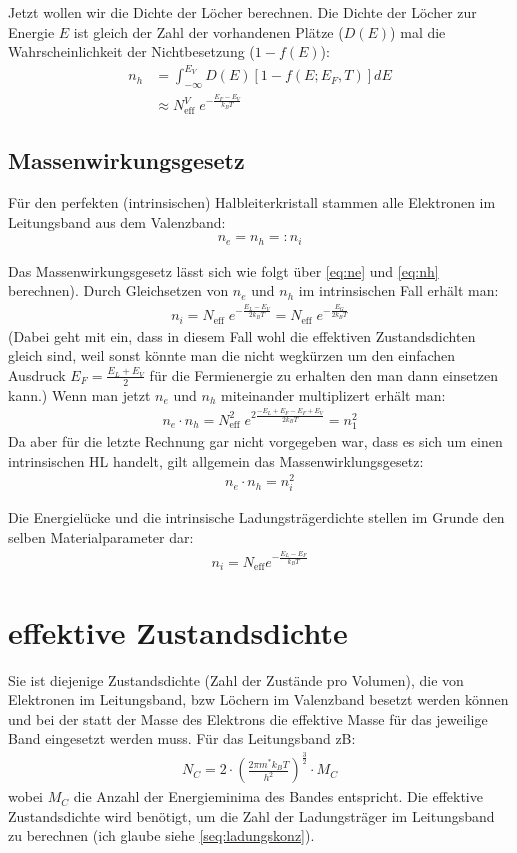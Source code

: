 \documentclass[paper=a4,10pt]{scrartcl}
\begin{document}
Jetzt wollen wir die Dichte der Löcher berechnen. Die Dichte der Löcher zur Energie $E$ ist gleich der Zahl der vorhandenen Plätze ($D(E)$) mal die Wahrscheinlichkeit der Nichtbesetzung ($1-f(E)$):
\begin{align}
\label{eq:nh}
n_h &= \int_{-\infty}^{E_V} D(E) [1-f(E; E_F, T)] dE \\
&\approx N^V_{\text{eff}} \;  e^{-\frac{E_F-E_V}{k_B T}}
\end{align}
\subsection{Massenwirkungsgesetz}
Für den perfekten (intrinsischen) Halbleiterkristall stammen alle Elektronen im Leitungsband aus dem Valenzband:
\begin{align}
n_e = n_h =: n_i
\end{align}

Das Massenwirkungsgesetz lässt sich wie folgt über \ref{eq:ne} und \ref{eq:nh} berechnen). Durch Gleichsetzen von $n_e$ und $n_h$ im intrinsischen Fall erhält man:
\begin{align}
n_i = N_{\text{eff}} \; e^{-\frac{E_L-E_V}{2k_BT}} = N_{\text{eff}} \; e^{-\frac{E_G}{2k_BT}}
\label{eq:intri_gleich}
\end{align}
(Dabei geht mit ein, dass in diesem Fall wohl die effektiven Zustandsdichten gleich sind, weil sonst könnte man die nicht wegkürzen um den einfachen Ausdruck $E_F = \frac{E_L + E_V}{2}$ für die Fermienergie zu erhalten den man dann einsetzen kann.)
Wenn man jetzt $n_e$ und $n_h$ miteinander multiplizert erhält man:
\begin{align}
n_e \cdot n_h = N^2_{\text{eff}} \; e^{2\frac{-E_L + E_F - E_F + E_V}{2k_BT}} = n_1^2
\end{align}
Da aber für die letzte Rechnung gar nicht vorgegeben war, dass es sich um einen intrinsischen HL handelt, gilt allgemein das Massenwirklungsgesetz:
\begin{align}
n_e \cdot n_h = n_i^2
\end{align}

Die Energielücke und die intrinsische Ladungsträgerdichte stellen im Grunde den selben Materialparameter dar:
\begin{align}
n_i = N_{\text{eff}} e^{- \frac{E_L-E_F}{k_BT}}
\end{align}
\section{effektive Zustandsdichte}
\label{sec:effZD}
Sie ist diejenige Zustandsdichte (Zahl der Zustände pro Volumen), die von Elektronen im Leitungsband, bzw Löchern im Valenzband besetzt werden können und bei der statt der Masse des Elektrons die effektive Masse für das jeweilige Band eingesetzt werden muss.
Für das Leitungsband zB:
\begin{align}
N_C = 2 \cdot \left( \frac{2 \pi m^* k_B T}{h^2} \right)^{\frac{3}{2}} \cdot M_C
\end{align}
wobei $M_C$ die Anzahl der Energieminima des Bandes entspricht. Die effektive Zustandsdichte wird benötigt, um die Zahl der Ladungsträger im Leitungsband zu berechnen (ich glaube siehe \ref{seq:ladungskonz}).
\end{document}
